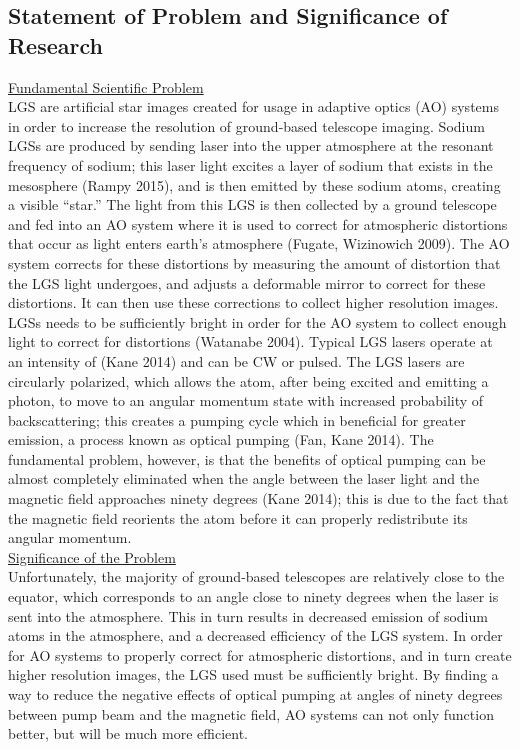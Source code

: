 \documentclass{article}
\begin{document}
\subsection{Statement of Problem and Significance of Research}
\underline{Fundamental Scientific Problem}\\
LGS are artificial star images created for usage in adaptive optics (AO) systems in order to increase the resolution of ground-based telescope imaging. Sodium LGSs are produced by sending laser into the upper atmosphere at the resonant frequency of sodium; this laser light excites a layer of sodium that exists in the mesosphere (Rampy 2015), and is then emitted by these sodium atoms, creating a visible “star.” The light from this LGS is then collected by a ground telescope and fed into an AO system where it is used to correct for atmospheric distortions that occur as light enters earth’s atmosphere (Fugate, Wizinowich 2009). The AO system corrects for these distortions by measuring the amount of distortion that the LGS light undergoes, and adjusts a deformable mirror to correct for these distortions. It can then use these corrections to collect higher resolution images.\\
LGSs needs to be sufficiently bright in order for the AO system to collect enough light to correct for distortions (Watanabe 2004). Typical LGS lasers operate at an intensity of  (Kane 2014) and can be CW or pulsed. The LGS lasers are circularly polarized, which allows the atom, after being excited and emitting a photon, to move to an angular momentum state with increased probability of backscattering; this creates a pumping cycle which in beneficial for greater emission, a process known as optical pumping (Fan, Kane 2014). The fundamental problem, however, is that the benefits of optical pumping can be almost completely eliminated when the angle between the laser light and the magnetic field approaches ninety degrees (Kane 2014); this is due to the fact that the magnetic field reorients the atom before it can properly redistribute its angular momentum.\\
\underline{Significance of the Problem}\\
Unfortunately, the majority of ground-based telescopes are relatively close to the equator, which corresponds to an angle close to ninety degrees when the laser is sent into the atmosphere. This in turn results in decreased emission of sodium atoms in the atmosphere, and a decreased efficiency of the LGS system. In order for AO systems to properly correct for atmospheric distortions, and in turn create higher resolution images, the LGS used must be sufficiently bright. By finding a way to reduce the negative effects of optical pumping at angles of ninety degrees between pump beam and the magnetic field, AO systems can not only function better, but will be much more efficient.\\
\end{document}
